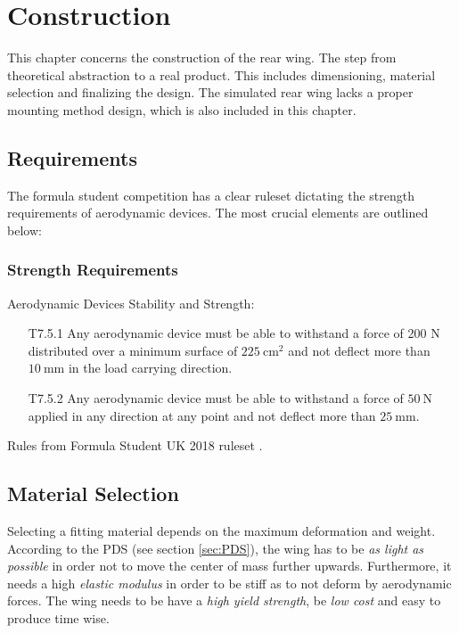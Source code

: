 \chapter{Construction}

  This chapter concerns the construction of the rear wing. The step from theoretical abstraction to a real product. This includes dimensioning, material selection and finalizing the design. The simulated rear wing lacks a proper mounting method design, which is also included in this chapter.

\section{Requirements}

  The formula student competition has a clear ruleset dictating the strength requirements of aerodynamic devices. The most crucial elements are outlined below:

  \subsection{Strength Requirements}
    \begin{tcolorbox}[colframe=seapurple,colback=seapurple!1]
      Aerodynamic Devices Stability and Strength:
      \begin{itemize}
        \item [T7.5.1] Any aerodynamic device must be able to withstand a force of 200 N distributed over a minimum surface of $\SI{225}{\centi\metre\squared}$ and not deflect more than $\SI{10}{\milli\metre}$ in the load carrying direction.
        \item [T7.5.2] Any aerodynamic device must be able to withstand a force of $\SI{50}{\newton}$ applied in any direction at any point and not deflect more than $\SI{25}{\milli\metre}$.
      \end{itemize}

      \hspace*{\fill}\tiny{Rules from Formula Student UK 2018 ruleset \cite{FSrules18}.}
    \end{tcolorbox}

\section{Material Selection}

  Selecting a fitting material depends on the maximum deformation and weight. According to the PDS (see section \ref{sec:PDS}), the wing has to be \emph{as light as possible} in order not to move the center of mass further upwards. Furthermore, it needs a high \emph{elastic modulus} in order to be stiff as to not deform by aerodynamic forces. The wing needs to be have a \emph{high yield strength}, be \emph{low cost} and easy to produce time wise.

